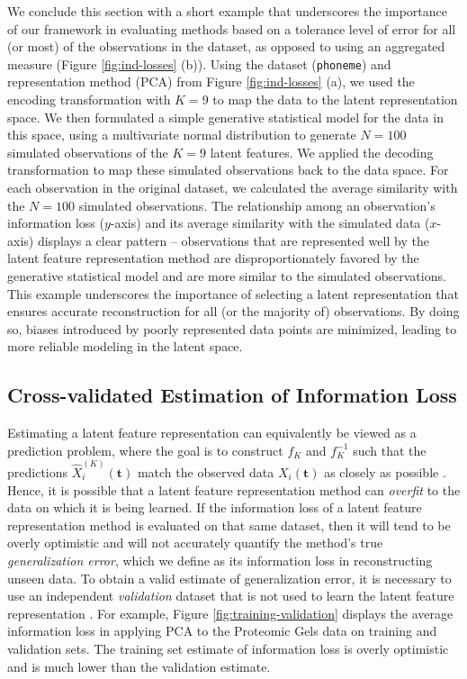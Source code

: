 We conclude this section with a short example that underscores the importance of our framework in evaluating methods based on a tolerance level of error for all (or most) of the observations in the dataset, as opposed to using an aggregated measure (Figure \ref{fig:ind-losses} (b)).
Using the dataset (\texttt{phoneme}) and representation method (PCA) from Figure \ref{fig:ind-losses} (a), we used the encoding transformation with $K=9$ to map the data to the latent representation space.
We then formulated a simple generative statistical model for the data in this space, using a multivariate normal distribution to generate $N=100$ simulated observations of the $K=9$ latent features.
We applied the decoding transformation to map these simulated observations back to the data space. For each observation in the original dataset, we calculated the average similarity with the $N=100$ simulated observations.
The relationship among an observation's information loss ($y$-axis) and its average similarity with the simulated data ($x$-axis) displays a clear pattern -- observations that are represented well by the latent feature representation method are disproportionately favored by the generative statistical model and are more similar to the simulated observations.
This example underscores the importance of selecting a latent representation that ensures accurate reconstruction for all (or the majority of) observations. By doing so, biases introduced by poorly represented data points are minimized, leading to more reliable modeling in the latent space.

\subsection{Cross-validated Estimation of Information Loss}

Estimating a latent feature representation can equivalently be viewed as a prediction problem, where the goal is to construct $f_{K}$ and $f_{K}^{-1}$ such that the predictions $\widehat{X}_i^{(K)}(\mathbf{t})$ match the observed data $X_i(\mathbf{t})$ as closely as possible \parencite{krzanowski_cross-validation_1987, wold_cross-validatory_1978, diana_cross-validation_2002}.
Hence, it is possible that a latent feature representation method can \emph{overfit} to the data on which it is being learned.
If the information loss of a latent feature representation method is evaluated on that same dataset, then it will tend to be overly optimistic and will not accurately quantify the method's true \emph{generalization error}, which we define as its information loss in reconstructing unseen data.
To obtain a valid estimate of generalization error, it is necessary to use an independent \emph{validation} dataset that is not used to learn the latent feature representation \parencite{diana_cross-validation_2002}.
For example, Figure \ref{fig:training-validation} displays the average information loss in applying PCA to the Proteomic Gels data \parencite{morris_pinnacle_2008} on training and validation sets.
The training set estimate of information loss is overly optimistic and is much lower than the validation estimate.


